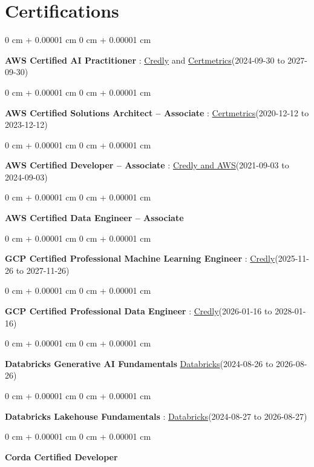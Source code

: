 \documentclass[10pt, letterpaper]{article}
\newenvironment{onecolentry}{
    \begin{adjustwidth}{
        0 cm + 0.00001 cm
    }{
        0 cm + 0.00001 cm
    }
}{
    \end{adjustwidth}
} %
\begin{document}
    \vspace{2 pt }
    \section{Certifications}
        \vspace{2 pt }
        \begin{samepage}
            \begin{onecolentry}
                \textbf{AWS Certified AI Practitioner} : \href{https://www.credly.com/badges/451b7ba5-8be1-4a8e-bbec-ade26627a6b6/public_url}{Credly} and \href{https://cp.certmetrics.com/amazon/en/public/verify/credential/495f0d9853874bf9a33c17f8e89ce131}{Certmetrics}(2024-09-30 to 2027-09-30)
            \end{onecolentry}
            \begin{onecolentry}
                \textbf{AWS Certified Solutions Architect – Associate} : \href{https://cp.certmetrics.com/amazon/en/public/verify/credential/SNBY48EBJJVE1SWX}{Certmetrics}(2020-12-12 to 2023-12-12)
            \end{onecolentry}
            \begin{onecolentry}
                \textbf{AWS Certified Developer – Associate} : \href{https://www.credly.com/badges/b8106fbd-d3d1-4204-8cdf-e708798fd582/public_url}{Credly and AWS}(2021-09-03  to 2024-09-03)
            \end{onecolentry}
            \begin{onecolentry}
                \textbf{AWS Certified Data Engineer – Associate}
            \end{onecolentry}
            \begin{onecolentry}
                \textbf{GCP Certified Professional Machine Learning Engineer} : \href{https://www.credly.com/badges/a6965347-09ea-4d8f-b398-0e151407160d/public_url}{Credly}(2025-11-26 to 2027-11-26)
            \end{onecolentry}
            \begin{onecolentry}
                \textbf{GCP Certified Professional Data Engineer} : \href{https://www.credly.com/badges/977e96d9-12e7-4f6c-b8a7-df71fb7153b8/public_url}{Credly}(2026-01-16 to 2028-01-16)
            \end{onecolentry}
            \begin{onecolentry}
                \textbf{Databricks Generative AI Fundamentals} \href{https://sgq.io/3uIFGNi}{Databricks}(2024-08-26 to 2026-08-26)
            \end{onecolentry}
            \begin{onecolentry}
                \textbf{Databricks Lakehouse Fundamentals} : \href{https://scl.io/FXGKS0u}{Databricks}(2024-08-27 to 2026-08-27)
            \end{onecolentry}
            \begin{onecolentry}
                \textbf{Corda Certified Developer}
            \end{onecolentry}
        \end{samepage}
\end{document}
